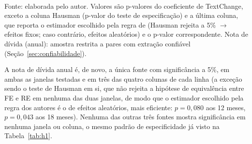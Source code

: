 \documentclass[a4paper,12pt]{report}
\begin{document}
\begin{table}[htbp]
    \centering
    \caption{Retorno anormal sob o desenho metodológico de Santos e Coelho (2018), universo expandido}
    \label{tab:santoscoelho}
    \small
    \\[0.3cm]
    {\footnotesize Fonte: elaborada pelo autor. Valores são p-valores do coeficiente de TextChange, exceto a coluna Hausman (p-valor do teste de especificação) e a última coluna, que reporta o estimador escolhido pela regra de  (Hausman rejeita a 5\% $\rightarrow$ efeitos fixos; caso contrário, efeitos aleatórios) e o p-valor correspondente. Nota de dívida (anual): amostra restrita a pares com extração confiável (Seção~\ref{sec:confiabilidade}).}
\end{table}

A nota de dívida anual é, de novo, a única fonte com significância a 5\%, em ambas as janelas testadas e em três das quatro colunas de cada linha (a exceção sendo o teste de Hausman em si, que não rejeita a hipótese de equivalência entre FE e RE em nenhuma das duas janelas, de modo que o estimador escolhido pela regra dos autores é o de efeitos aleatórios, mais eficiente: $p=0{,}080$ aos 12 meses, $p=0{,}043$ aos 18 meses). Nenhuma das outras três fontes mostra significância em nenhuma janela ou coluna, o mesmo padrão de especificidade já visto na Tabela~\ref{tab:h1}.
\end{document}
